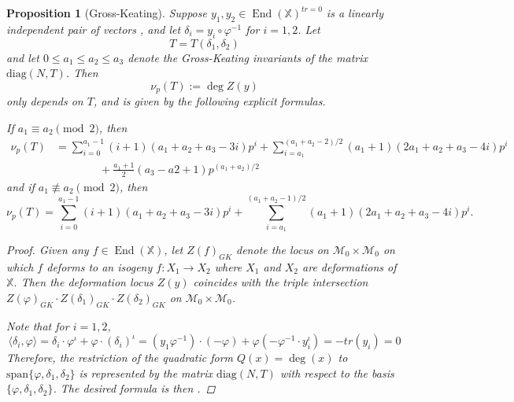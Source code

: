 \documentclass[reqno,oneside]{amsart}
\theoremstyle{plain}
\newtheorem{proposition}[theorem]{Proposition}
\theoremstyle{remark}
\numberwithin{theorem}{section}
\newcommand{\bbX}{\mathbb X}
\newcommand{\calM}{\mathcal M}
\DeclareMathOperator{\End}{End}
\begin{document}
	\begin{proposition}[Gross-Keating] \label{prop:local deg}
		Suppose  $y_1, y_2  \in \End(\bbX)^{tr=0}$ is a linearly independent pair of vectors , and let  $\delta_i = y_i \circ \varphi^{-1}$ for $i = 1,2$. Let
		\begin{equation}
		T = T(\delta_1, \delta_2)
		\end{equation}
		and let $0 \leq a_1 \leq a_2 \leq a_3$ denote the Gross-Keating invariants of the matrix $\mathrm{diag}(N, T)$. Then
		\begin{equation}
		\nu_p(T) :=	\deg Z(y)
		\end{equation} only depends on $T$, and is given by the following explicit formulas.
		
		If $a_1 \equiv a_2 \pmod 2$, then
		\begin{align}
		\nu_p(T) &= \sum_{i=0}^{a_1 - 1} (i+1)(a_1 + a_2 + a_3 - 3i)p^i + \sum_{i = a_1}^{(a_1 + a_2 - 2)/2} (a_1 + 1) (2 a_1+a_2 + a_3 - 4i)p^i \\
		& \qquad \qquad + \frac{a_1+1}{2}(a_3 - a2 + 1) p^{(a_1 + a_2)/2}
		\end{align}
		and if $a_1 \not\equiv a_2 \pmod 2$, then
		\begin{equation}
		\nu_p(T) = \sum_{i=0}^{a_1 - 1} (i+1) (a_1 + a_2 + a_3 - 3i) p^i + \sum_{i = a_1}^{(a_1 + a_2 - 1)/2} (a_1 + 1)(2a_1 + a_2 + a_3 - 4i)p^i.
		\end{equation}
		\begin{proof}
			Given any $f \in \End(\bbX)$, let $Z(f)_{GK}$ denote the locus on $\calM_0 \times \calM_0$ on which $f$ deforms to an isogeny $f \colon X_1 \to X_2$ where $X_1$ and $X_2$ are deformations of $\mathbb X$. Then the deformation locus $Z(y)$ coincides with the triple intersection $Z(\varphi)_{GK} \cdot Z(\delta_1)_{GK} \cdot Z(\delta_2 )_{GK}$ on $\calM_0 \times \calM_0$.
			
			Note that for $i = 1,2$,
			\begin{equation}
			\langle \delta_i,  \varphi \rangle  = \delta_i \cdot \varphi^{\iota} +  \varphi \cdot (\delta_i)^{\iota}  =  (y_1 \varphi^{-1}) \cdot (- \varphi) + \varphi (- \varphi^{-1} \cdot y_i^{\iota}) =  - tr(y_i) = 0
			\end{equation}
			Therefore, the restriction of the quadratic form $Q(x) = \deg(x)$ to $\mathrm{span}\{  \varphi, \delta_1, \delta_2 \}$ is represented by the matrix $\mathrm{diag}(N, T)$ with respect to the basis $\{ \varphi, \delta_1, \delta_2 \}$. The desired formula is then \cite[Proposition 5.4]{GK}.
		\end{proof}
	\end{proposition}
	
\end{document}
